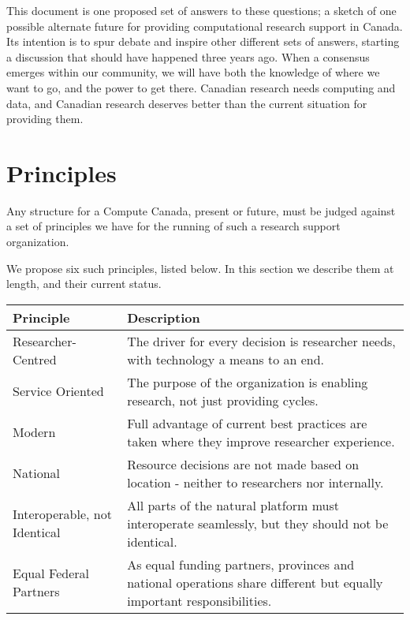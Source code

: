 \documentclass[11pt]{article}
\begin{document}
This document is one proposed set of answers to these questions; a sketch of
one possible alternate future for providing computational research support 
in Canada.  Its intention is to spur debate and inspire other different
sets of answers, starting a discussion that should have happened three years ago.
When a consensus emerges within our community, we will have both the knowledge
of where we want to go, and the power to get there.  Canadian research needs 
computing and data, and Canadian research deserves better than the current 
situation for providing them.

\section*{Principles}

Any structure for a Compute Canada, present or future, must be
judged against a set of principles we have for the running of such
a research support organization. 

We propose six such principles, listed below.  In this section we describe
them at length, and their current status.  

\begin{table}[ht]
\centering
\small {\sffamily
{}
\begin{tabular}{l|p{3.5in}}
\textcolor{cdaRed}{\textbf{Principle}} & \textcolor{cdaRed}{\textbf{Description}} \\
\hline
\hline
Researcher-Centred & The driver for every decision is researcher needs, with technology a means to an end. \\
Service Oriented & The purpose of the organization is enabling research, not just providing cycles. \\
Modern & Full advantage of current best practices are taken where they improve researcher experience. \\
National & Resource decisions are not made based on location - neither to researchers nor internally. \\
Interoperable, not Identical & All parts of the natural platform must interoperate seamlessly, but they should not be identical. \\
Equal Federal Partners & As equal funding partners, provinces and national operations share different but equally important responsibilities. \\
\hline
\end{tabular}
}
\end{table}
\end{document}
